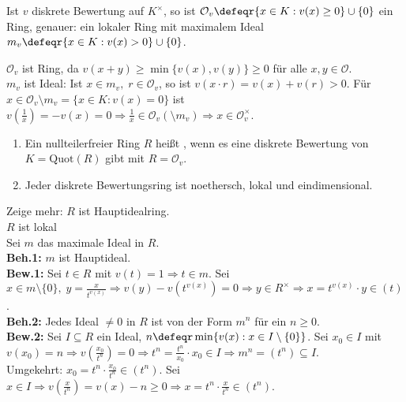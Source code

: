 \begin{Bem}
Ist $v$ diskrete Bewertung auf $K^{\times}$, so ist $\mathcal{O}_v \defeqr \{x
\in K: v(x) \geq 0\} \cup \{0\}$ ein Ring, genauer: ein lokaler Ring mit
maximalem Ideal $m_v \defeqr \{ x \in K: v(x) > 0\} \cup \{0\}$.
\end{Bem}

\begin{Bew} 
$\mathcal{O}_v$ ist Ring, da $v(x+y) \geq \min\{v(x),v(y)\} \geq 0$ für alle
$x,y \in \mathcal{O}$.\\
$m_v$ ist Ideal: Ist $x \in m_v, \; r \in \mathcal{O}_v$, so ist $v(x \cdot r) =
v(x) + v(r) > 0$. Für $x \in \mathcal{O}_v \setminus m_v = \{x \in K: v(x) = 0\}$
ist $v(\frac{1}{x})=-v(x)=0 \Rightarrow \frac{1}{x} \in \mathcal{O}_v(\setminus
m_v) \Rightarrow x \in \mathcal{O}_v^{\times}$.
\end{Bew}

\begin{DefProp}
\label{2.38}
\begin{enumerate}
  \item Ein nullteilerfreier Ring $R$ heißt , wenn es eine diskrete
  Bewertung von $K = \mathrm{Quot}(R)$ gibt mit $R = \mathcal{O}_v$.
  \item Jeder diskrete Bewertungsring ist noethersch, lokal und eindimensional.
\end{enumerate}
\end{DefProp}

\begin{Bew}
Zeige mehr: $R$ ist Hauptidealring.\\
$R$ ist lokal \checkmark\\
Sei $m$ das maximale Ideal in $R$.\\
\textbf{Beh.1:} $m$ ist Hauptideal.\\
\textbf{Bew.1:} Sei $t \in R$ mit $v(t)=1 \Rightarrow t \in m$. Sei $x \in m
\setminus\{0\},\; y = \frac{x}{t^{v(x)}} \Rightarrow v(y) - v(t^{v(x)}) = 0
\Rightarrow y \in R^{\times} \Rightarrow x = t^{v(x)} \cdot y \in (t)$.\\
\textbf{Beh.2:} Jedes Ideal $\not= 0$ in $R$ ist von der Form $m^n$ für ein $n
\geq 0$.\\
\textbf{Bew.2:} Sei $I \subseteq R$ ein Ideal, $n \defeqr \min\{v(x): x \in I
\setminus\{0\}\}$. Sei $x_0 \in I$ mit $v(x_0) = n \Rightarrow
v(\frac{x_0}{t^n})=0 \Rightarrow t^n = \frac{t^n}{x_0} \cdot x_0 \in I
\Rightarrow m^n = (t^n) \subseteq I$.\\
Umgekehrt: $x_0 = t^n \cdot \frac{x_0}{t^n} \in (t^n)$. Sei $x \in I \Rightarrow
v(\frac{x}{t^n})=v(x)-n \geq 0 \Rightarrow x = t^n \cdot \frac{x}{t^n}\in (t^n)$.
\end{Bew}

